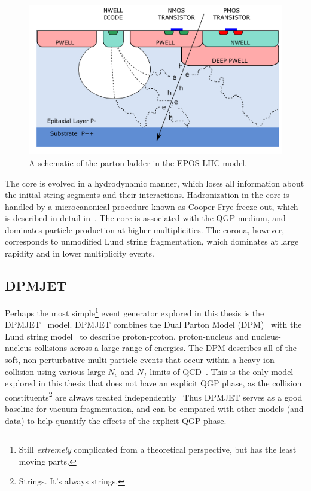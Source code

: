 \begin{figure}[ht]
    \centering
    \includegraphics[width=0.5\linewidth]{figures/experiment/alpide_cross.png}
    \caption{A schematic of the parton ladder in the EPOS LHC model.}
    \label{fig:parton_ladder}
\end{figure}

The core is evolved in a hydrodynamic manner, which loses all information about the initial string segments and their interactions. Hadronization in the core is handled by a microcanonical procedure known as Cooper-Frye freeze-out, which is described in detail in~\cite{CooperFrye}. The core is associated with the QGP medium, and dominates particle production at higher multiplicities. The corona, however, corresponds to unmodified Lund string fragmentation, which dominates at large rapidity and in lower multiplicity events. 

\subsection{DPMJET}

Perhaps the most simple\footnote{Still \textit{extremely} complicated from a theoretical perspective, but has the least moving parts.} event generator explored in this thesis is the DPMJET~\cite{DPMJET} model. DPMJET combines the Dual Parton Model (DPM)~\cite{DPM} with the Lund string model~\cite{LundString} to describe proton-proton, proton-nucleus and nucleus-nucleus collisions across a large range of energies. The DPM describes all of the soft, non-perturbative multi-particle events that occur within a heavy ion collision using various large $N_c$ and $N_f$ limits of QCD~\cite{}. This is the only model explored in this thesis that does not have an explicit QGP phase, as the collision constituents\footnote{Strings. It's always strings.} are always treated independently~\cite{} Thus DPMJET serves as a good baseline for vacuum fragmentation, and can be compared with other models (and data) to help quantify the effects of the explicit QGP phase.